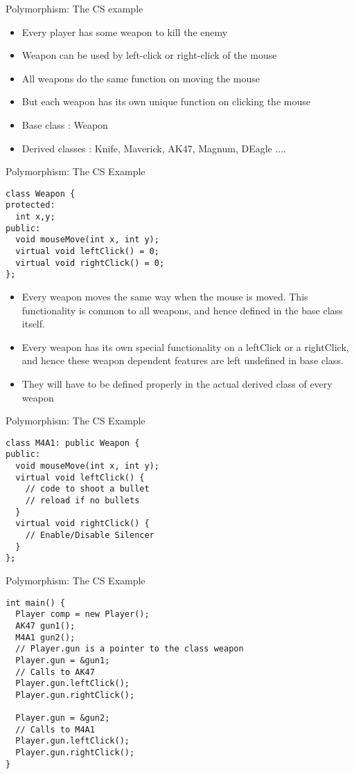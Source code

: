 \documentclass{beamer}
\begin{document}
\begin{frame}[fragile]{Polymorphism: The CS example}
  \begin{itemize}
  \item Every player has some weapon to kill the enemy\pause
  \item Weapon can be used by left-click or right-click of the mouse\pause
  \item All weapons do the same function on moving the mouse\pause
  \item But each weapon has its own unique function on clicking the mouse\pause
  \item Base class : Weapon\pause
  \item Derived classes : Knife, Maverick, AK47, Magnum, DEagle ....
  \end{itemize}
\end{frame}

\begin{frame}[fragile]{Polymorphism: The CS Example}
  \begin{lstlisting}
class Weapon {
protected:
  int x,y;
public:
  void mouseMove(int x, int y);
  virtual void leftClick() = 0;
  virtual void rightClick() = 0;
};
  \end{lstlisting}\pause
  \begin{itemize}
  \item Every weapon moves the same way when the mouse is moved. This functionality is common to all weapons, and hence defined in the base class itself.\pause
  \item Every weapon has its own special functionality on a leftClick or a rightClick, and hence these weapon dependent features are left undefined in base class.\pause
  \item They will have to be defined properly in the actual derived class of every weapon
  \end{itemize}
\end{frame}

\begin{frame}[fragile]{Polymorphism: The CS Example}
  \begin{lstlisting}
class M4A1: public Weapon {
public:
  void mouseMove(int x, int y);
  virtual void leftClick() {
    // code to shoot a bullet
    // reload if no bullets
  }
  virtual void rightClick() {
    // Enable/Disable Silencer
  }
};
  \end{lstlisting}
\end{frame}

\begin{frame}[fragile]{Polymorphism: The CS Example}
  \begin{lstlisting}
int main() {
  Player comp = new Player();
  AK47 gun1();
  M4A1 gun2();
  // Player.gun is a pointer to the class weapon
  Player.gun = &gun1;
  // Calls to AK47
  Player.gun.leftClick();
  Player.gun.rightClick();

  Player.gun = &gun2;
  // Calls to M4A1
  Player.gun.leftClick();
  Player.gun.rightClick();
}
  \end{lstlisting}
\end{frame}
\end{document}
